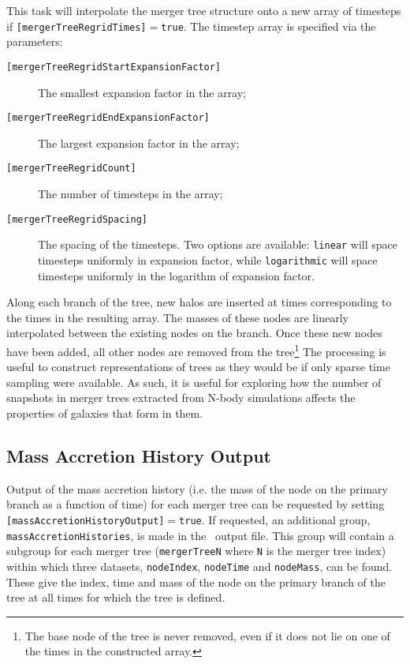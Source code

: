 This task will interpolate the merger tree structure onto a new array of timesteps if {\tt [mergerTreeRegridTimes]}$=${\tt true}. The timestep array is specified via the parameters:
\begin{description}
\item[{\tt [mergerTreeRegridStartExpansionFactor]}] The smallest expansion factor in the array;
\item[{\tt [mergerTreeRegridEndExpansionFactor]}] The largest expansion factor in the array;
\item[{\tt [mergerTreeRegridCount]}] The number of timesteps in the array;
\item[{\tt [mergerTreeRegridSpacing]}] The spacing of the timesteps. Two options are available: {\tt linear} will space timesteps uniformly in expansion factor, while {\tt logarithmic} will space timesteps uniformly in the logarithm of expansion factor.
\end{description}
Along each branch of the tree, new halos are inserted at times corresponding to the times in the resulting array. The masses of these nodes are linearly interpolated between the existing nodes on the branch. Once these new nodes have been added, all other nodes are removed from the tree\footnote{The base node of the tree is never removed, even if it does not lie on one of the times in the constructed array.} The processing is useful to construct representations of trees as they would be if only sparse time sampling were available. As such, it is useful for exploring how the number of snapshots in merger trees extracted from N-body simulations affects the properties of galaxies that form in them.

\subsection{Mass Accretion History Output}

Output of the mass accretion history (i.e. the mass of the node on the primary branch as a function of time) for each merger tree can be requested by setting {\tt [massAccretionHistoryOutput]}$=${\tt true}. If requested, an additional group, {\tt massAccretionHistories}, is made in the \glc\ output file. This group will contain a subgroup for each merger tree ({\tt mergerTreeN} where {\tt N} is the merger tree index) within which three datasets, {\tt nodeIndex}, {\tt nodeTime} and {\tt nodeMass}, can be found. These give the index, time and mass of the node on the primary branch of the tree at all times for which the tree is defined.

